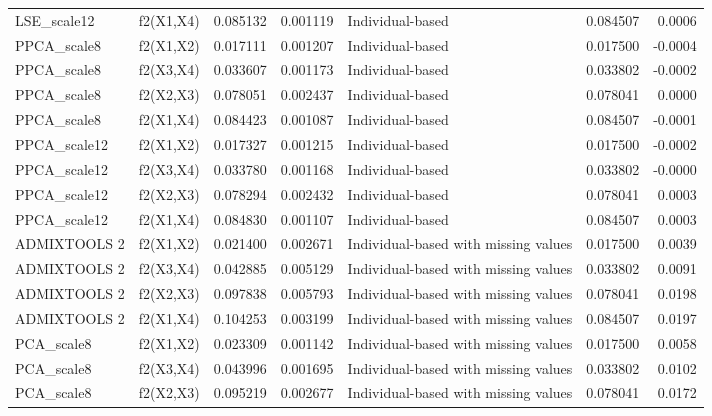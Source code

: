 \begin{tabular}{llrrlrr}
 LSE\_scale12 &       f2(X1,X4) & 0.085132 &        0.001119 &                     Individual-based &    0.084507 &  0.0006 \\
 PPCA\_scale8 &       f2(X1,X2) & 0.017111 &        0.001207 &                     Individual-based &    0.017500 & -0.0004 \\
 PPCA\_scale8 &       f2(X3,X4) & 0.033607 &        0.001173 &                     Individual-based &    0.033802 & -0.0002 \\
 PPCA\_scale8 &       f2(X2,X3) & 0.078051 &        0.002437 &                     Individual-based &    0.078041 &  0.0000 \\
 PPCA\_scale8 &       f2(X1,X4) & 0.084423 &        0.001087 &                     Individual-based &    0.084507 & -0.0001 \\
PPCA\_scale12 &       f2(X1,X2) & 0.017327 &        0.001215 &                     Individual-based &    0.017500 & -0.0002 \\
PPCA\_scale12 &       f2(X3,X4) & 0.033780 &        0.001168 &                     Individual-based &    0.033802 & -0.0000 \\
PPCA\_scale12 &       f2(X2,X3) & 0.078294 &        0.002432 &                     Individual-based &    0.078041 &  0.0003 \\
PPCA\_scale12 &       f2(X1,X4) & 0.084830 &        0.001107 &                     Individual-based &    0.084507 &  0.0003 \\
ADMIXTOOLS 2 &       f2(X1,X2) & 0.021400 &        0.002671 & Individual-based with missing values &    0.017500 &  0.0039 \\
ADMIXTOOLS 2 &       f2(X3,X4) & 0.042885 &        0.005129 & Individual-based with missing values &    0.033802 &  0.0091 \\
ADMIXTOOLS 2 &       f2(X2,X3) & 0.097838 &        0.005793 & Individual-based with missing values &    0.078041 &  0.0198 \\
ADMIXTOOLS 2 &       f2(X1,X4) & 0.104253 &        0.003199 & Individual-based with missing values &    0.084507 &  0.0197 \\
  PCA\_scale8 &       f2(X1,X2) & 0.023309 &        0.001142 & Individual-based with missing values &    0.017500 &  0.0058 \\
  PCA\_scale8 &       f2(X3,X4) & 0.043996 &        0.001695 & Individual-based with missing values &    0.033802 &  0.0102 \\
  PCA\_scale8 &       f2(X2,X3) & 0.095219 &        0.002677 & Individual-based with missing values &    0.078041 &  0.0172 \\

\end{tabular}
